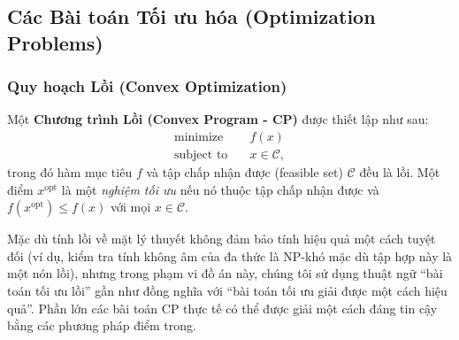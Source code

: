 \subsection{Các Bài toán Tối ưu hóa (Optimization Problems)}

\subsubsection{Quy hoạch Lồi (Convex Optimization)}
Một \textbf{Chương trình Lồi (Convex Program - CP)} được thiết lập như sau:
\begin{subequations}
\label{eq:convex_program}
\begin{align}
\text{minimize} \quad   & f(x) \label{eq:cp_objective}                \\
\text{subject to} \quad & x \in \mathcal{C}, \label{eq:cp_constraint}
\end{align}
\end{subequations}
trong đó hàm mục tiêu $f$ và tập chấp nhận được (feasible set) $\mathcal{C}$ đều là lồi. Một điểm $x^{\text{opt}}$ là một \textit{nghiệm tối ưu} nếu nó thuộc tập chấp nhận được và $f(x^{\text{opt}}) \leq f(x)$ với mọi $x \in \mathcal{C}$.

Mặc dù tính lồi về mặt lý thuyết không đảm bảo tính hiệu quả một cách tuyệt đối (ví dụ, kiểm tra tính không âm của đa thức là NP-khó mặc dù tập hợp này là một nón lồi), nhưng trong phạm vi đồ án này, chúng tôi sử dụng thuật ngữ ``bài toán tối ưu lồi'' gần như đồng nghĩa với ``bài toán tối ưu giải được một cách hiệu quả''. Phần lớn các bài toán CP thực tế có thể được giải một cách đáng tin cậy bằng các phương pháp điểm trong.

